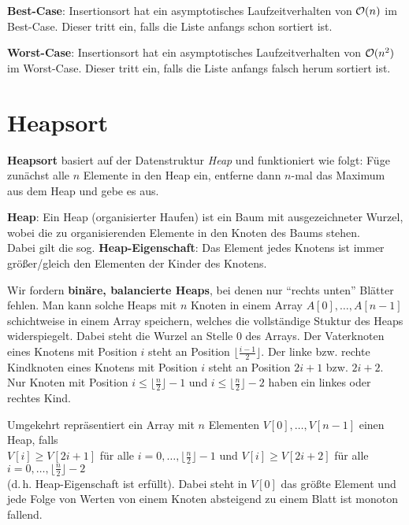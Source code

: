 \linie

\textbf{Best-Case}:
Insertionsort hat ein asymptotisches Laufzeitverhalten von
$\mathcal{O}(n)$ im Best-Case.
Dieser tritt ein, falls die Liste anfangs schon sortiert ist.

\textbf{Worst-Case}:
Insertionsort hat ein asymptotisches Laufzeitverhalten von
$\mathcal{O}(n^2)$ im Worst-Case.
Dieser tritt ein, falls die Liste anfangs falsch herum sortiert ist.

\section{%
    Heapsort%
}

\textbf{Heapsort} basiert auf der Datenstruktur \emph{Heap} und funktioniert
wie folgt:
Füge zunächst alle $n$ Elemente in den Heap ein,
entferne dann $n$-mal das Maximum aus dem Heap und gebe es aus.

\textbf{Heap}:
Ein Heap (organisierter Haufen) ist ein Baum mit ausgezeichneter Wurzel, wobei
die zu organisierenden Elemente in den Knoten des Baums stehen. \\
Dabei gilt die sog. \textbf{Heap-Eigenschaft}: Das Element jedes Knotens ist
immer größer/gleich den Elementen der Kinder des Knotens.

\linie

Wir fordern \textbf{binäre, balancierte Heaps}, bei denen nur "`rechts
unten"' Blätter fehlen.
Man kann solche Heaps mit $n$ Knoten in einem Array $A[0], \ldots, A[n - 1]$
schichtweise in einem Array speichern, welches die vollständige Stuktur des
Heaps widerspiegelt.
Dabei steht die Wurzel an Stelle $0$ des Arrays.
Der Vaterknoten eines Knotens mit Position $i$ steht an Position
$\lfloor \frac{i - 1}{2} \rfloor$.
Der linke bzw. rechte Kindknoten eines Knotens mit Position $i$ steht an
Position $2i + 1$ bzw. $2i + 2$.
Nur Knoten mit Position $i \le \lfloor \frac{n}{2} \rfloor - 1$ und
$i \le \lfloor \frac{n}{2} \rfloor - 2$ haben ein linkes oder rechtes Kind.

Umgekehrt repräsentiert ein Array mit $n$ Elementen $V[0], \ldots, V[n - 1]$
einen Heap, falls \\
$V[i] \ge V[2i + 1]$ für alle $i = 0, \ldots, \lfloor \frac{n}{2} \rfloor - 1$
und
$V[i] \ge V[2i + 2]$ für alle $i = 0, \ldots, \lfloor \frac{n}{2} \rfloor - 2$
\\
(d.\,h. Heap-Eigenschaft ist erfüllt).
Dabei steht in $V[0]$ das größte Element und jede Folge von Werten von einem
Knoten absteigend zu einem Blatt ist monoton fallend.

